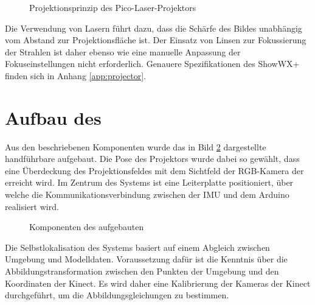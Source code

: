 
\begin{figure}[ht]
	\begin{center}
		\caption{Projektionsprinzip des Pico-Laser-Projektors}
		\label{fig.projtech}
	\end{center}
\end{figure}

\prever{
}

Die Verwendung von Lasern führt dazu, dass die Schärfe des Bildes unabhängig vom Abstand zur Projektionsfläche ist. Der Einsatz von Linsen zur Fokussierung der Strahlen ist daher ebenso wie eine manuelle Anpassung der Fokuseinstellungen nicht erforderlich. Genauere Spezifikationen des ShowWX+\textsuperscript{\texttrademark} finden sich in Anhang \ref{app:projector}.

\section{Aufbau des }
Aus den beschriebenen Komponenten wurde das in Bild \ref{fig.kinpro} dargestellte handführbare \kps{} aufgebaut. Die Pose des Projektors wurde dabei so gewählt, dass eine Überdeckung des Projektionsfeldes mit dem Sichtfeld der RGB-Kamera der \kin erreicht wird. Im Zentrum des Systems ist eine Leiterplatte positioniert, über welche die Kommunikationsverbindung zwischen der IMU und dem Arduino realisiert wird.\\

\begin{figure}[ht]
	\begin{center}%
		\caption{Komponenten des aufgebauten }
		\label{fig.kinpro}
	\end{center}
\end{figure}

Die Selbstlokalisation des Systems basiert auf einem Abgleich zwischen Umgebung und Modelldaten. Voraussetzung dafür ist die Kenntnis über die Abbildungstransformation zwischen den Punkten der Umgebung und den Koordinaten der Kinect. Es wird daher eine Kalibrierung der Kameras der Kinect durchgeführt, um die Abbildungsgleichungen zu bestimmen.\\

